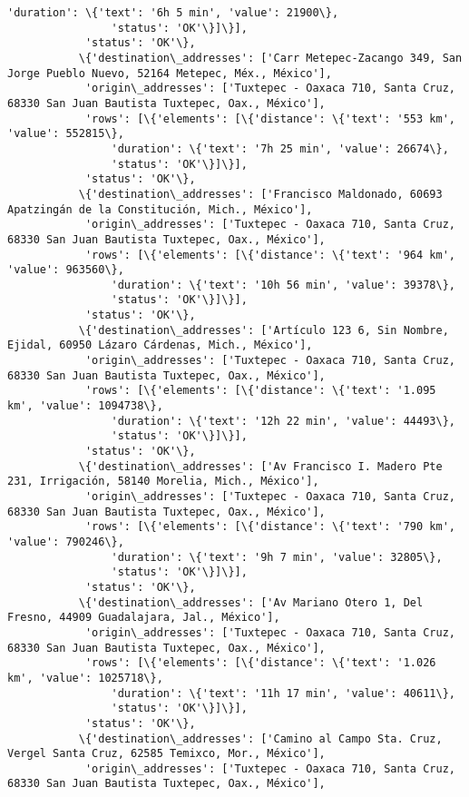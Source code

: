 \documentclass[11pt]{article}
\begin{document}
\begin{Verbatim}[commandchars=\\\{\}]
                'duration': \{'text': '6h 5 min', 'value': 21900\},
                'status': 'OK'\}]\}],
            'status': 'OK'\},
           \{'destination\_addresses': ['Carr Metepec-Zacango 349, San Jorge Pueblo Nuevo, 52164 Metepec, Méx., México'],
            'origin\_addresses': ['Tuxtepec - Oaxaca 710, Santa Cruz, 68330 San Juan Bautista Tuxtepec, Oax., México'],
            'rows': [\{'elements': [\{'distance': \{'text': '553 km', 'value': 552815\},
                'duration': \{'text': '7h 25 min', 'value': 26674\},
                'status': 'OK'\}]\}],
            'status': 'OK'\},
           \{'destination\_addresses': ['Francisco Maldonado, 60693 Apatzingán de la Constitución, Mich., México'],
            'origin\_addresses': ['Tuxtepec - Oaxaca 710, Santa Cruz, 68330 San Juan Bautista Tuxtepec, Oax., México'],
            'rows': [\{'elements': [\{'distance': \{'text': '964 km', 'value': 963560\},
                'duration': \{'text': '10h 56 min', 'value': 39378\},
                'status': 'OK'\}]\}],
            'status': 'OK'\},
           \{'destination\_addresses': ['Artículo 123 6, Sin Nombre, Ejidal, 60950 Lázaro Cárdenas, Mich., México'],
            'origin\_addresses': ['Tuxtepec - Oaxaca 710, Santa Cruz, 68330 San Juan Bautista Tuxtepec, Oax., México'],
            'rows': [\{'elements': [\{'distance': \{'text': '1.095 km', 'value': 1094738\},
                'duration': \{'text': '12h 22 min', 'value': 44493\},
                'status': 'OK'\}]\}],
            'status': 'OK'\},
           \{'destination\_addresses': ['Av Francisco I. Madero Pte 231, Irrigación, 58140 Morelia, Mich., México'],
            'origin\_addresses': ['Tuxtepec - Oaxaca 710, Santa Cruz, 68330 San Juan Bautista Tuxtepec, Oax., México'],
            'rows': [\{'elements': [\{'distance': \{'text': '790 km', 'value': 790246\},
                'duration': \{'text': '9h 7 min', 'value': 32805\},
                'status': 'OK'\}]\}],
            'status': 'OK'\},
           \{'destination\_addresses': ['Av Mariano Otero 1, Del Fresno, 44909 Guadalajara, Jal., México'],
            'origin\_addresses': ['Tuxtepec - Oaxaca 710, Santa Cruz, 68330 San Juan Bautista Tuxtepec, Oax., México'],
            'rows': [\{'elements': [\{'distance': \{'text': '1.026 km', 'value': 1025718\},
                'duration': \{'text': '11h 17 min', 'value': 40611\},
                'status': 'OK'\}]\}],
            'status': 'OK'\},
           \{'destination\_addresses': ['Camino al Campo Sta. Cruz, Vergel Santa Cruz, 62585 Temixco, Mor., México'],
            'origin\_addresses': ['Tuxtepec - Oaxaca 710, Santa Cruz, 68330 San Juan Bautista Tuxtepec, Oax., México'],

\end{Verbatim}
\end{document}
